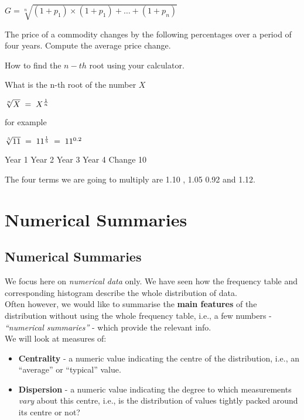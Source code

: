 $G = \sqrt[n]{(1+p_1) \times (1+p_1) +  \ldots + (1+p_n)}$

The price of a commodity changes by the following percentages over a period of four years.
Compute the average price change.



How to find the $n-th$ root using your calculator.

What is the n-th root of the number $X$

$\sqrt[n]{X} \;= \; X^{1 \over n} $

for example

$\sqrt[5]{11} \;= \; 11^{1 \over 5} \;= \; 11^{0.2} $



Year 1 Year 2 Year 3 Year 4
Change 10%


The four terms we are going to multiply are
1.10 , 1.05 0.92 and 1.12.








\section{Numerical Summaries}
\subsection{Numerical Summaries}
\begin{frame}{\bf {}}
We focus here on \emph{numerical data} only. We have seen how the frequency table and corresponding histogram describe the whole distribution of data.\\[0.4cm]
Often however, we would like to summarise the {\bf main features} of the distribution without using the whole frequency table, i.e., a few numbers - \emph{``numerical summaries''} - which provide the relevant info.\\[0.5cm]
We will look at measures of:
\begin{itemize}\itemsep0.4cm
\item {\bf Centrality} - a numeric value indicating the centre of the distribution, i.e., an ``average'' or ``typical'' value.
\item {\bf Dispersion} - a numeric value indicating the degree to which measurements \emph{vary} about this centre, i.e., is the distribution of values tightly packed around its centre or not?
\end{itemize}

\end{frame}

